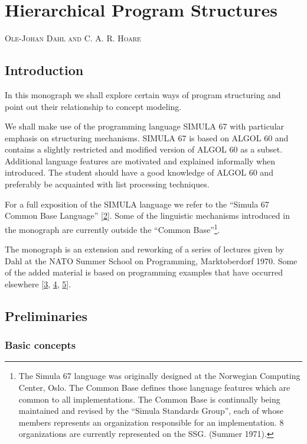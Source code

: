 \chapter{Hierarchical Program Structures}

{
	\noindent
	\scshape\hfill\scriptsize Ole-Johan Dahl and C. A. R. Hoare\hfill
}
\renewcommand{\leftmark}{\normalfont\scriptsize\hfill OLE-JOHAN DAHL AND C. A. R. HOARE\hfill}

\section{Introduction}

In this monograph we shall explore certain ways of program structuring and point out their relationship to concept modeling.

We shall make use of the programming language SIMULA 67 with particular emphasis on structuring mechanisms. SIMULA 67 is based on ALGOL 60 and contains a slightly restricted and modified version of ALGOL 60 as a subset. Additional language features are motivated and explained informally when introduced. The student should have a good knowledge of ALGOL 60 and preferably be acquainted with list processing techniques.

For a full exposition of the SIMULA language we refer to the ``Simula 67 Common Base Language'' [\hyperref[ref:2]{2}]. Some of the linguistic mechanisms introduced in the monograph are currently outside the ``Common Base''\footnote{The Simula 67 language was originally designed at the Norwegian Computing Center, Oslo. The Common Base defines those language features which are common to all implementations. The Common Base is continually being maintained and revised by the ``Simula Standards Group'', each of whose members represents an organization responsible for an implementation. 8 organizations are currently represented on the SSG. (Summer 1971).}.

The monograph is an extension and reworking of a series of lectures given by Dahl at the NATO Summer School on Programming, Marktoberdorf 1970. Some of the added material is based on programming examples that have occurred elsewhere [\hyperref[ref:3]{3}, \hyperref[ref:4]{4}, \hyperref[ref:5]{5}].

\section{Preliminaries}

\subsection{Basic concepts}

